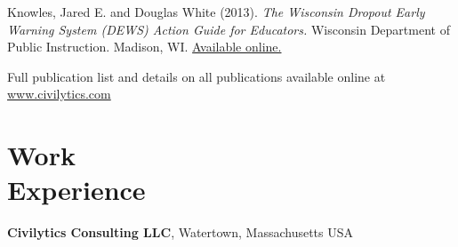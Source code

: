\documentclass[margin,line]{res}
\begin{document}
\begin{resume}
Knowles, Jared E. and Douglas White (2013). \emph{The Wisconsin Dropout Early 
Warning System (DEWS) Action Guide for Educators.} Wisconsin Department of Public 
Instruction. Madison, WI. \href{http://dpi.wi.gov/dews}{Available online.}



% 
% 
% 

Full publication list and details on all publications available online at 
\url{www.civilytics.com}

\vspace*{-3mm}
\section{\sc Work \\ Experience}
{\bf Civilytics Consulting LLC}, Watertown, Massachusetts USA


\end{resume}
\end{document}
